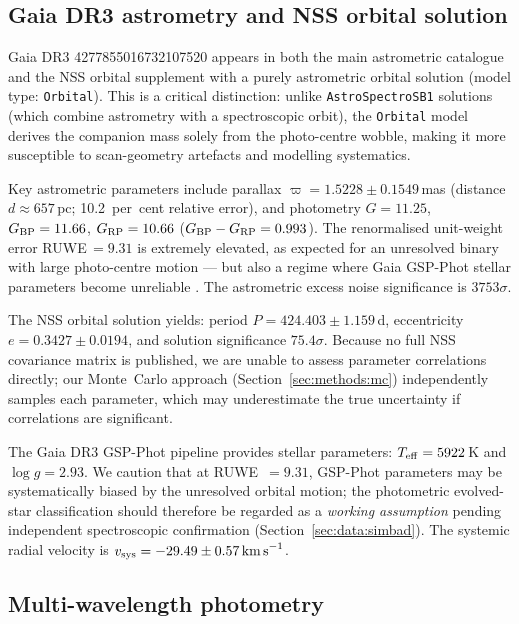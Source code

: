 \documentclass[usenatbib,fleqn]{mnras}
\newcommand{\kms}{{\rm km\,s}^{-1}}
\begin{document}
\subsection{Gaia DR3 astrometry and NSS orbital solution}
\label{sec:data:gaia}

Gaia DR3 4277855016732107520 appears in both the main astrometric
catalogue and the NSS orbital supplement with a purely astrometric
orbital solution (model type: \texttt{Orbital}).  This is a critical
distinction: unlike \texttt{AstroSpectroSB1} solutions (which
combine astrometry with a spectroscopic orbit), the \texttt{Orbital}
model derives the companion mass solely from the photo-centre
wobble, making it more susceptible to scan-geometry artefacts and
modelling systematics.

Key astrometric parameters include parallax
$\varpi = 1.5228 \pm 0.1549$\,mas (distance $d \approx 657$\,pc;
10.2~per~cent relative error),
and photometry $G = 11.25$, $G_{\rm BP} = 11.66$,
$G_{\rm RP} = 10.66$ ($G_{\rm BP} - G_{\rm RP} = 0.993$).
The renormalised unit-weight error RUWE$\,= 9.31$ is extremely
elevated, as expected for an unresolved binary with large
photo-centre motion --- but also a regime where
Gaia GSP-Phot stellar parameters become unreliable
\citep{Andrae2023}.  The astrometric excess noise significance is
$3753\sigma$.

The NSS orbital solution yields:
period $P = 424.403 \pm 1.159$\,d,
eccentricity $e = 0.3427 \pm 0.0194$,
and solution significance $75.4\sigma$.
Because no full NSS covariance matrix is published, we are unable to
assess parameter correlations directly; our Monte~Carlo approach
(Section~\ref{sec:methods:mc}) independently samples each parameter,
which may underestimate the true uncertainty if correlations are
significant.

The Gaia DR3 GSP-Phot pipeline provides stellar parameters:
$T_{\rm eff} = 5922$\,K and $\log g = 2.93$.  We caution that at
RUWE~$= 9.31$, GSP-Phot parameters may be systematically biased
by the unresolved orbital motion; the photometric evolved-star classification should
therefore be regarded as a \emph{working assumption} pending
independent spectroscopic confirmation
(Section~\ref{sec:data:simbad}).
The systemic radial velocity is
$v_{\rm sys} = -29.49 \pm 0.57\,\kms$.

\subsection{Multi-wavelength photometry}
\label{sec:data:phot}
\end{document}
